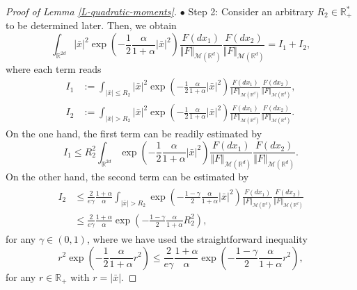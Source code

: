\documentclass[reqno]{amsart}
\numberwithin{equation}{section}
\begin{document}
{\begin{proof}[Proof of Lemma \ref{L-quadratic-moments}]
$\bullet$ {\sc Step 2}: Consider an arbitrary $R_2\in \mathbb{R}_+^*$ to be determined later. Then, we obtain
$$\int_{\mathbb{R}^{2d}}\vert \bar x\vert^2 \exp\left(-\frac{1}{2}\frac{\alpha}{1+\alpha}\vert \bar x\vert^2\right)\frac{F(dx_1)}{\Vert F\Vert_{\mathcal{M}(\mathbb{R}^d)}}\frac{F(dx_2)}{\Vert F\Vert_{\mathcal{M}(\mathbb{R}^d)}}=I_1+I_2,$$
where each term reads
\begin{align*}
I_1&:=\int_{\vert \bar x\vert\leq R_2}\vert \bar x\vert^2 \exp\left(-\frac{1}{2}\frac{\alpha}{1+\alpha}\vert \bar x\vert^2\right)\frac{F(dx_1)}{\Vert F\Vert_{\mathcal{M}(\mathbb{R}^d)}}\frac{F(dx_2)}{\Vert F\Vert_{\mathcal{M}(\mathbb{R}^d)}},\\
I_2&:=\int_{\vert \bar x\vert >R_2}\vert \bar x\vert^2 \exp\left(-\frac{1}{2}\frac{\alpha}{1+\alpha}\vert \bar x\vert^2\right)\frac{F(dx_1)}{\Vert F\Vert_{\mathcal{M}(\mathbb{R}^d)}}\frac{F(dx_2)}{\Vert F\Vert_{\mathcal{M}(\mathbb{R}^d)}}.
\end{align*}
On the one hand, the first term can be readily estimated by
\begin{equation}\label{E-quadratic-moment-numerator-1}
I_1\leq R_2^2\int_{\mathbb{R}^{2d}}\exp\left(-\frac{1}{2}\frac{\alpha}{1+\alpha}\vert \bar x\vert^2\right)\frac{F(dx_1)}{\Vert F\Vert_{\mathcal{M}(\mathbb{R}^d)}}\frac{F(dx_2)}{\Vert F\Vert_{\mathcal{M}(\mathbb{R}^d)}}.
\end{equation}
On the other hand, the second term can be estimated by
\begin{align}\label{E-quadratic-moment-numerator-2}
\begin{aligned}
I_2&\leq \frac{2}{e\gamma}\frac{1+\alpha}{\alpha}\int_{\vert \bar x\vert>R_2}\exp\left(-\frac{1-\gamma}{2}\frac{\alpha}{1+\alpha}\vert \bar x\vert^2\right)\frac{F(dx_1)}{\Vert F\Vert_{\mathcal{M}(\mathbb{R}^d)}}\frac{F(dx_2)}{\Vert F\Vert_{\mathcal{M}(\mathbb{R}^d)}}\\
&\leq \frac{2}{e\gamma}\frac{1+\alpha}{\alpha}\exp\left(-\frac{1-\gamma}{2}\frac{\alpha}{1+\alpha}R_2^2\right),
\end{aligned}
\end{align}
for any $\gamma\in (0,1)$, where we have used the straightforward inequality
$$r^2\exp\left(-\frac{1}{2}\frac{\alpha}{1+\alpha}r^2\right)\leq \frac{2}{e\gamma}\frac{1+\alpha}{\alpha}\exp\left(-\frac{1-\gamma}{2}\frac{\alpha}{1+\alpha}r^2\right),$$
for any $r\in \mathbb{R}_+$ with $r=\vert \bar x\vert$.

\medskip 


\end{proof}}
\end{document}
